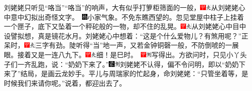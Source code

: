 刘姥姥只听见``咯当''``咯当''的响声，大有似乎打箩柜筛面的一般，{{\includegraphics[width=3mm]{../Images/00002}\includegraphics[width=3mm]{../Images/00012}\footnotesize \kaishu 从刘姥姥心中意中幻拟出奇怪文字。　}\includegraphics[width=3mm]{../Images/00008}\footnotesize \kaishu 小家气象。}不免东瞧西望的。忽见堂屋中柱子上挂着一个匣子，底下又坠着一个秤砣般的一物，却不住的乱晃。{\includegraphics[width=3mm]{../Images/00002}\includegraphics[width=3mm]{../Images/00012}\footnotesize \kaishu 从刘姥姥心中目中设譬拟想，真是镜花水月。}刘姥姥心中想着：``这是个什么爱物儿？有煞用呢？''正呆时，{\includegraphics[width=3mm]{../Images/00002}\includegraphics[width=3mm]{../Images/00012}\footnotesize \kaishu 三字有劲。}陡听得``当''地一声，又若金钟铜磬一般，不防倒唬的一展眼。接着又是一连八九下。{\includegraphics[width=3mm]{../Images/00002}\includegraphics[width=3mm]{../Images/00012}\footnotesize \kaishu 细！是巳时。　\includegraphics[width=3mm]{../Images/00002}\includegraphics[width=3mm]{../Images/00011}\footnotesize \kaishu 写得出。}方欲问时，只见小丫头子们一齐乱跑，说：``奶奶下来了。''{\includegraphics[width=3mm]{../Images/00006}\includegraphics[width=3mm]{../Images/00011}\footnotesize \kaishu 刘姥姥不认得，偏不令问明，即以``奶奶下来了''结局，是画云龙妙手。}平儿与周瑞家的忙起身，命刘姥姥：``只管坐着等，是时候我们来请你呢。''说着，都迎出去了。

